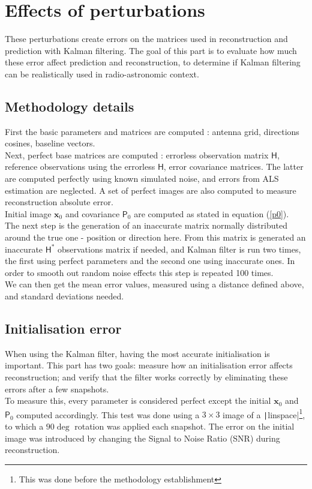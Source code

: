 \documentclass[titlepage]{article}
\renewcommand{\H}{\boldsymbol{\mathsf{H}}}
\newcommand{\x}{\boldsymbol{x}}
\renewcommand{\P}{\boldsymbol{\mathsf{P}}}
\begin{document}
	\section{Effects of perturbations}
	
	These perturbations create errors on the matrices used in reconstruction and prediction with Kalman filtering. The goal of this part is to evaluate how much these error affect prediction and reconstruction, to determine if Kalman filtering can be realistically used in radio-astronomic context. \\
	
	\subsection{Methodology details}

	First the basic parameters and matrices are computed : antenna grid, directions cosines, baseline vectors.\\ Next, perfect base matrices are computed : errorless observation matrix $\H$, reference observations using the errorless $\H$, error covariance matrices. The latter are computed perfectly using known simulated noise, and errors from ALS estimation are neglected. A set of perfect images are also computed to measure reconstruction absolute error.\\
	Initial image $\x_0$ and covariance $\P_0$ are computed as stated in equation (\ref{p0}).\\
	
	The next step is the generation of an inaccurate matrix normally distributed around the true one - position or direction here. From this matrix is generated an inaccurate  $\H^*$ observations matrix if needed, and Kalman filter is run two times, the first using perfect parameters and the second one using inaccurate ones. In order to smooth out random noise effects this step is repeated 100 times. \\
	
	We can then get the mean error values, measured using a distance defined above, and standard deviations needed.
	
	\subsection{Initialisation error}
	
	When using the Kalman filter, having the most accurate initialisation is important. This part has two goals: measure how an initialisation error affects reconstruction; and verify that the filter works correctly by eliminating these errors after a few snapshots. \\
	To measure this, every parameter is considered perfect except the initial $\x_0$ and $\P_0$ computed accordingly. This test was done using a $3\times 3$ image of a \texttt|linspace|\footnote{This was done before the methodology establishment}, to which a $90\deg$ rotation was applied each snapshot. The error on the initial image was introduced by changing the Signal to Noise Ratio (SNR) during reconstruction. \\
	
\end{document}

